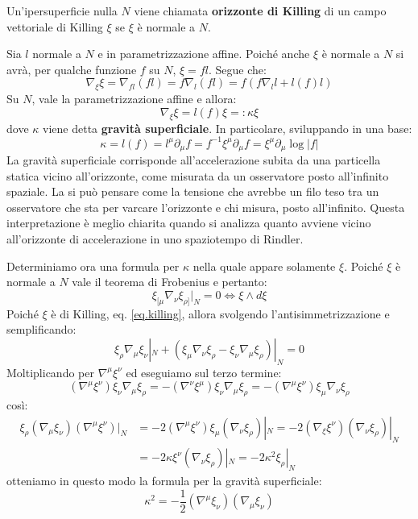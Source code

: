 \begin{definizione}
    Un'ipersuperficie nulla $N$ viene chiamata \textbf{orizzonte di Killing} di un campo vettoriale di Killing $\xi$ se $\xi$ è normale a $N$.
\end{definizione}
Sia $l$ normale a $N$ e in parametrizzazione affine. Poiché anche $\xi$ è normale a $N$ si avrà, per qualche funzione $f$  su $N$, $\xi = f l$. Segue che:
\begin{equation*}
    \nabla_\xi \xi = \nabla_{fl}(fl) = f \nabla_l (fl) = f( f\nabla_l l + l(f) l)
\end{equation*}
Su $N$, vale la parametrizzazione affine e allora:
\begin{equation*}
    \nabla_\xi \xi = l(f) \xi =: \kappa \xi
\end{equation*}
dove $\kappa$ viene detta \textbf{gravità superficiale}. In particolare, sviluppando in una base:
\begin{equation}
    \kappa = l(f) = l^\mu \partial_\mu f = f^{-1} \xi^\mu \partial_\mu f = \xi^\mu \partial_\mu \log |f|
    \label{eq.grav_superficiale}
\end{equation}
La gravità superficiale corrisponde all'accelerazione subita da una particella statica vicino all'orizzonte, come misurata da un osservatore posto all'infinito spaziale. La si può pensare come la tensione che avrebbe un filo teso tra un osservatore che sta per varcare l'orizzonte e chi misura, posto all'infinito. Questa interpretazione è meglio chiarita quando si analizza quanto avviene vicino all'orizzonte di accelerazione in uno spaziotempo di Rindler.

Determiniamo ora una formula per $\kappa$ nella quale appare solamente $\xi$. Poiché $\xi$ è normale a $N$ vale il teorema di Frobenius e pertanto:
\begin{equation*}
    \xi_{[\mu}\nabla_{\nu}\xi_{\rho]}|_N = 0 \iff \xi \wedge d\xi
\end{equation*}
Poiché $\xi$ è di Killing, eq. \ref{eq.killing}, allora svolgendo l'antisimmetrizzazione e semplificando:
\begin{equation*}
    \xi_\rho \nabla_\mu \xi_\nu |_N + (\xi_\mu \nabla_\nu \xi_\rho - \xi_\nu \nabla_\mu \xi_\rho)|_N = 0
\end{equation*}
Moltiplicando per $\nabla^\mu \xi^\nu$ ed eseguiamo sul terzo termine:
\begin{equation*}
    (\nabla^\mu \xi^\nu) \xi_\nu \nabla_\mu \xi_\rho = - (\nabla^\nu \xi^\mu)\xi_\nu \nabla_\mu \xi_\rho = - (\nabla^\mu \xi^\nu) \xi_\mu \nabla_\nu \xi_\rho
\end{equation*}
così:
\begin{align*}
    \xi_\rho (\nabla_\mu \xi_\nu)(\nabla^\mu \xi^\nu) |_N &= -2(\nabla^\mu \xi^\nu) \xi_\mu (\nabla_\nu \xi_\rho) |_N = -2(\nabla_\xi \xi^\nu)(\nabla_\nu \xi_\rho)|_N \\
    &= -2 \kappa \xi^\nu (\nabla_\nu \xi_\rho)|_N = -2 \kappa^2 \xi_\rho|_N
\end{align*}
otteniamo in questo modo la formula per la gravità superficiale:
\begin{equation}
    \kappa^2 = -\frac{1}{2}(\nabla^\mu \xi_\nu)(\nabla_\mu \xi_\nu)
    \label{eq.gravità_sup_quadrata}
\end{equation}

